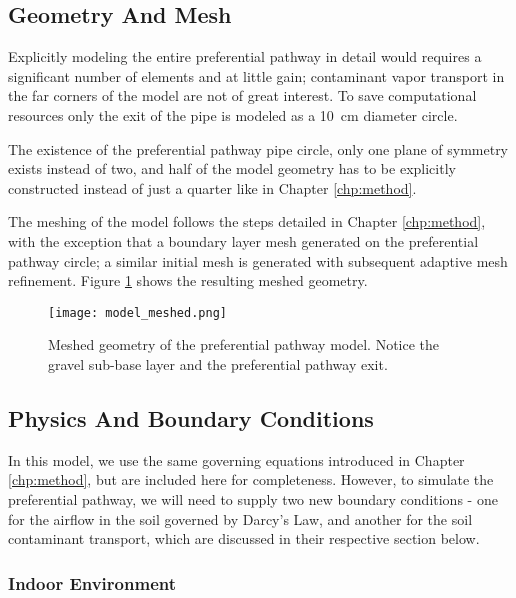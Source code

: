 \subsection{Geometry And Mesh}

Explicitly modeling the entire preferential pathway in detail would requires a significant number of elements and at little gain; contaminant vapor transport in the far corners of the model are not of great interest.
To save computational resources only the exit of the pipe is modeled as a \SI{10}{\centi\metre} diameter circle.\par

The existence of the preferential pathway pipe circle, only one plane of symmetry exists instead of two, and half of the model geometry has to be explicitly constructed instead of just a quarter like in Chapter \ref{chp:method}.\par

The meshing of the model follows the steps detailed in Chapter \ref{chp:method}, with the exception that a boundary layer mesh generated on the preferential pathway circle; a similar initial mesh is generated with subsequent adaptive mesh refinement.
Figure \ref{fig:model_meshed} shows the resulting meshed geometry.\par

\begin{figure}[htb!]
  \centering
  \texttt{[image: model\_meshed.png]}
  \caption{Meshed geometry of the preferential pathway model. Notice the gravel sub-base layer and the preferential pathway exit.}
  \label{fig:model_meshed}
\end{figure}

\subsection{Physics And Boundary Conditions}

In this model, we use the same governing equations introduced in Chapter \ref{chp:method}, but are included here for completeness.
However, to simulate the preferential pathway, we will need to supply two new boundary conditions  - one for the airflow in the soil governed by Darcy's Law, and another for the soil contaminant transport, which are discussed in their respective section below.

\subsubsection{Indoor Environment}

